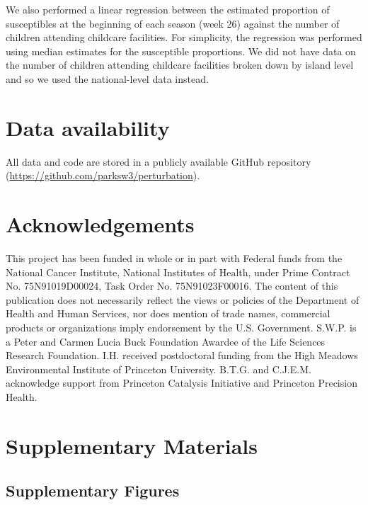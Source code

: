 \documentclass[12pt]{article}
\begin{document}
We also performed a linear regression between the estimated proportion of susceptibles at the beginning of each season (week 26) against the number of children attending childcare facilities.
For simplicity, the regression was performed using median estimates for the susceptible proportions.
We did not have data on the number of children attending childcare facilities broken down by island level and so we used the national-level data instead.

\section*{Data availability}

All data and code are stored in a publicly available GitHub repository (\url{https://github.com/parksw3/perturbation}).

\section*{Acknowledgements}

This project has been funded in whole or in part with Federal funds from the National Cancer Institute, National Institutes of Health, under Prime Contract No. 75N91019D00024, Task Order No. 75N91023F00016. 
The content of this publication does not necessarily reflect the views or policies of the Department of Health and Human Services, nor does mention of trade names, commercial products or organizations imply endorsement by the U.S. Government.
S.W.P. is a Peter and Carmen Lucia Buck Foundation Awardee of the Life Sciences Research Foundation. 
I.H. received postdoctoral funding from the High Meadows Environmental Institute of Princeton University.
B.T.G. and C.J.E.M. acknowledge support from Princeton Catalysis Initiative and Princeton Precision Health.

\pagebreak

\setcounter{figure}{0}
\setcounter{equation}{0}
\renewcommand{\thefigure}{S\arabic{figure}}
\renewcommand{\theequation}{S\arabic{equation}}

\section*{Supplementary Materials}

\subsection*{Supplementary Figures}
\end{document}
